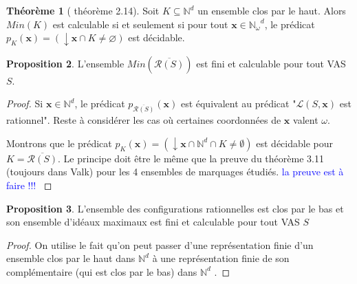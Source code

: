 \documentclass[a4paper,final]{article}
\theoremstyle{definition}
\newtheorem{Theorem}{Théorème}
\newtheorem{Proposition}[Theorem]{Proposition}
\newtheorem{Corollary}[Theorem]{Corollaire}
\newcommand{\alain}[1]{\textcolor{blue}{#1}}
\let\vide\varnothing
\newcommand{\Min}{\textit{Min}}
\newcommand{\N}{\ensuremath{\mathbb{N}}}
\newcommand{\Nomega}{\ensuremath{\mathbb{N}_\omega}}
\newcommand{\lang}{\ensuremath{\mathcal{L}}}
\newcommand{\vect}[1]{\ensuremath{\mathbf{#1}}}
\newcommand{\inirat}{\mathcal{R}}
\begin{document}
\begin{Theorem}[\cite{vaja85} théorème 2.14]
Soit $K \subseteq \N^d$ un ensemble clos par le haut.
Alors $\Min(K)$ est calculable si et seulement si pour tout $\vect{x} \in \Nomega^d$, le prédicat $p_K(\vect{x}) = (\downarrow \vect{x} \cap K \neq \vide)$ est décidable.
\end{Theorem}

\begin{Proposition}\label{minimaux}
L'ensemble $\Min(\overline{\inirat(S)})$ est fini et calculable pour tout VAS $S$.
\end{Proposition}

\begin{proof}
Si $\vect{x}\in\N^d$, le prédicat $p_{\overline{\inirat(S)}}(\vect{x})$ est équivalent au prédicat "$\lang(S,\vect{x})$ est rationnel".
Reste à considérer les cas où certaines coordonnées de $\vect{x}$ valent $\omega$.

Montrons que le prédicat $p_K(\vect{x})=(\downarrow \vect{x} \cap \N^d \cap K \neq \emptyset)$ est décidable pour $K=\overline{\inirat(S)}$. Le principe doit être le même que la preuve du théorème 3.11 (toujours dans Valk) pour les 4 ensembles de marquages étudiés.
\alain{la preuve est à faire !!! }
\end{proof}



\begin{Proposition}\label{maximaux}
L'ensemble des configurations rationnelles est clos par le bas et son ensemble d'idéaux maximaux est fini et calculable pour tout VAS $S$ 
\end{Proposition}

\begin{proof}
On utilise le fait qu'on peut passer d'une représentation finie d'un ensemble clos par le haut dans $\N^d$ à une représentation finie de son complémentaire (qui est clos par le bas) dans $\N^d$ \cite{GHKNS-til2020}.

\end{proof}
\end{document}
